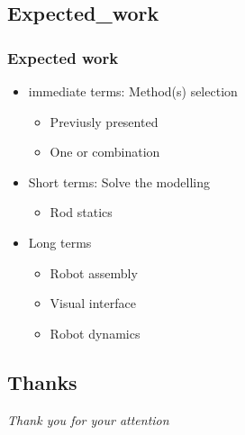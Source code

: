 \documentclass[compress]{thesisbeamer}
\begin{document}
      	\subsection{Expected_work}
        \begin{frame}
        	\frametitle{Expected work}
        	\begin{itemize}
        		\item immediate terms: Method(s) selection
        		\begin{itemize}
        			\item Previusly presented 
        			\item One or combination
        		\end{itemize}
        		\item Short terms: Solve the modelling
  				\begin{itemize}%
   					\item Rod statics
        		\end{itemize}
        		\item Long terms
  				\begin{itemize}%
   					\item Robot assembly
   					\item Visual interface
   					\item Robot dynamics
  				\end{itemize}
        	\end{itemize}
        \end{frame}
        	
        \subsection{Thanks}
        \begin{frame}
  			\centering \Large
  			\emph{Thank you for your attention}
        \end{frame}
        
\begin{frame}
	\printbibliography
\end{frame}
        	
\end{document}
